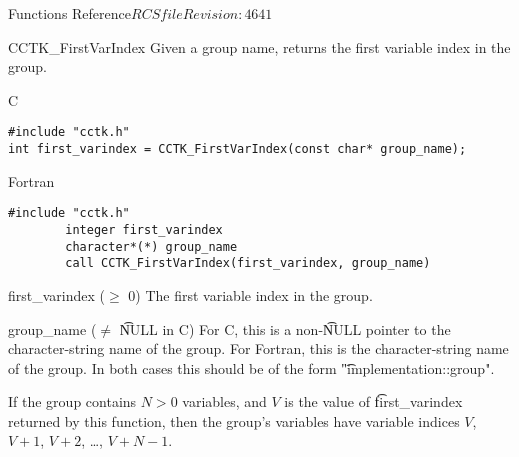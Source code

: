 \begin{cactuspart}{ Functions Reference}{$RCSfile$}{$Revision: 4641 $}


\begin{FunctionDescription}{CCTK\_FirstVarIndex}
\label{CCTK-FirstVarIndex}
Given a group name, returns the first variable index in the group.

\begin{SynopsisSection}
\begin{Synopsis}{C}
\begin{verbatim}
#include "cctk.h"
int first_varindex = CCTK_FirstVarIndex(const char* group_name);
\end{verbatim}
\end{Synopsis}
\begin{Synopsis}{Fortran}
\begin{verbatim}
#include "cctk.h"
        integer first_varindex
        character*(*) group_name
        call CCTK_FirstVarIndex(first_varindex, group_name)
\end{verbatim}
\end{Synopsis}
\end{SynopsisSection}

\begin{ResultSection}
\begin{Result}{first\_varindex ($\ge$ 0)}
The first variable index in the group.
\end{Result}
\end{ResultSection}

\begin{ParameterSection}
\begin{Parameter}{group\_name ($\ne$ {\t NULL} in C)}
For C, this is a non-{\t NULL} pointer to the character-string name
of the group.  For Fortran, this is the character-string name of the
group.  In both cases this should be of the form
{\t "implementation::group"}.
\end{Parameter}
\end{ParameterSection}

\begin{Discussion}
If the group contains $N > 0$ variables, and $V$ is the value of
{\t first\_varindex} returned by this function, then the group's
variables have variable indices $V$, $V+1$, $V+2$, \dots, $V+N-1$.
\end{Discussion}


\end{FunctionDescription}
\end{cactuspart}
